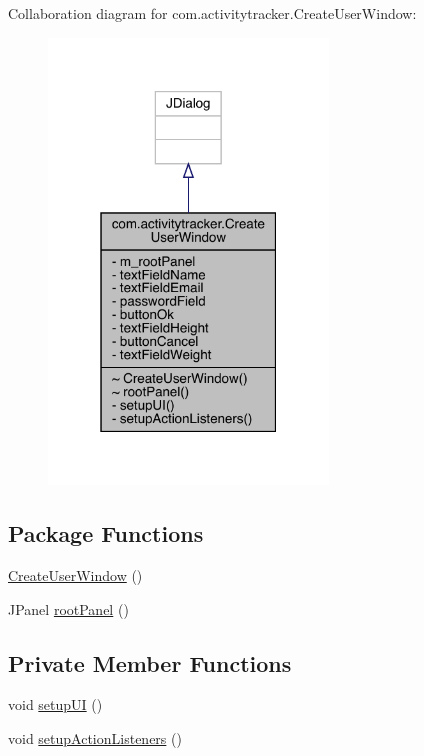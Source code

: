 Collaboration diagram for com.\+activitytracker.\+Create\+User\+Window\+:
\nopagebreak
\begin{figure}[H]
\begin{center}
\leavevmode
\includegraphics[width=211pt]{classcom_1_1activitytracker_1_1_create_user_window__coll__graph}
\end{center}
\end{figure}
\subsection*{Package Functions}
\begin{DoxyCompactItemize}
\item 
\mbox{\hyperlink{classcom_1_1activitytracker_1_1_create_user_window_a46b8b719c490fe8f658fa7a1f27d0be7}{Create\+User\+Window}} ()
\item 
J\+Panel \mbox{\hyperlink{classcom_1_1activitytracker_1_1_create_user_window_a862f018ae96eb5df7529ff1beb312ff1}{root\+Panel}} ()
\end{DoxyCompactItemize}
\subsection*{Private Member Functions}
\begin{DoxyCompactItemize}
\item 
void \mbox{\hyperlink{classcom_1_1activitytracker_1_1_create_user_window_a41715d85194c6bb84cf6969f771940dc}{setup\+UI}} ()
\item 
void \mbox{\hyperlink{classcom_1_1activitytracker_1_1_create_user_window_a174a05a389ca6f3b7979ac9c5028a3ae}{setup\+Action\+Listeners}} ()
\end{DoxyCompactItemize}
